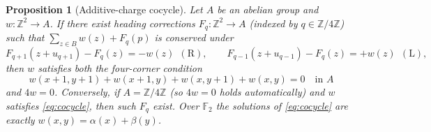 \documentclass[11pt,reqno]{amsart}
\theoremstyle{plain}
\newtheorem{proposition}[theorem]{Proposition}
\theoremstyle{definition}
\newcommand{\Z}{\mathbb{Z}}
\newcommand{\F}{\mathbb{F}}
\newcommand{\turnR}{\mathrm{R}}
\newcommand{\turnL}{\mathrm{L}}
\begin{document}
\begin{proposition}[Additive-charge cocycle]\label{prop:cocycle}
Let $A$ be an abelian group and $w:\Z^2\to A$. If there exist heading corrections
$F_q:\Z^2\to A$ (indexed by $q\in\Z/4\Z$) such that $\sum_{z\in B}w(z)+F_q(p)$ is
conserved under
\begin{equation}\label{eq:pot}
F_{q+1}(z+u_{q+1})-F_q(z)=-w(z)\ \ (\turnR),\qquad
F_{q-1}(z+u_{q-1})-F_q(z)=+w(z)\ \ (\turnL),
\end{equation}
then $w$ satisfies both the four-corner condition
\begin{equation}\label{eq:cocycle}
w(x{+}1,y{+}1)+w(x{+}1,y)+w(x,y{+}1)+w(x,y)=0\quad\text{in }A
\end{equation}
and $4w=0$. Conversely, if $A=\Z/4\Z$ \emph{(}so $4w=0$ holds automatically\emph{)}
and $w$ satisfies \eqref{eq:cocycle}, then such $F_q$ exist. Over $\F_2$ the solutions
of \eqref{eq:cocycle} are exactly $w(x,y)=\alpha(x)+\beta(y)$.
\end{proposition}
\end{document}

